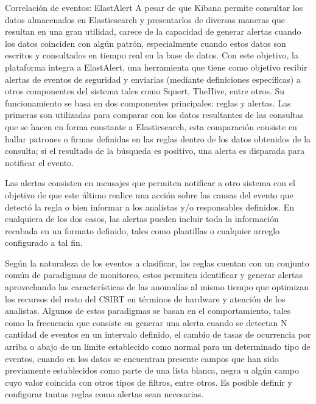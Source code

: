    \begin{section}{Correlación de eventos: ElastAlert}
   \label{seccion4-5}
     A pesar de que Kibana permite consultar los datos almacenados en Elasticsearch y presentarlos de diversas maneras que resultan en una gran utilidad, carece de la capacidad de generar alertas cuando los datos coinciden con algún patrón, especialmente cuando estos datos son escritos y consultados en tiempo real en la base de datos. Con este objetivo, la plataforma integra a ElastAlert, una herramienta que tiene como objetivo recibir alertas de eventos de seguridad y enviarlas (mediante definiciones específicas) a otros componentes del sistema tales como Squert, TheHive, entre otros. Su funcionamiento se basa en dos componentes principales: reglas y alertas. Las primeras son utilizadas para comparar con los datos resultantes de las consultas que se hacen en forma constante a Elasticsearch, esta comparación consiste en hallar patrones o firmas definidas en las reglas dentro de los datos obtenidos de la consulta; si el resultado de la búsqueda es positivo, una alerta es disparada para notificar el evento. \par
     Las alertas consisten en mensajes que permiten notificar a otro sistema con el objetivo de que este último realice una acción sobre las causas del evento que detectó la regla o bien informar a los analistas y/o responsables definidos. En cualquiera de los dos casos, las alertas pueden incluir toda la información recabada en un formato definido, tales como plantillas o cualquier arreglo configurado a tal fin. \par
     Según la naturaleza de los eventos a clasificar, las reglas cuentan con un conjunto común de paradigmas de monitoreo, estos permiten identificar y generar alertas aprovechando las características de las anomalías al mismo tiempo que optimizan los recursos del resto del CSIRT en términos de hardware y atención de los analistas. Algunos de estos paradigmas se basan en el comportamiento, tales como la frecuencia que consiste en generar una alerta cuando se detectan N cantidad de eventos en un intervalo definido, el cambio de tasas de ocurrencia por arriba o abajo de un límite establecido como normal para un determinado tipo de eventos, cuando en los datos se encuentran presente campos que han sido previamente establecidos como parte de una lista blanca, negra u algún campo cuyo valor coincida con otros tipos de filtros, entre otros. Es posible definir y configurar tantas reglas como alertas sean necesarias. \par

   \end{section}
